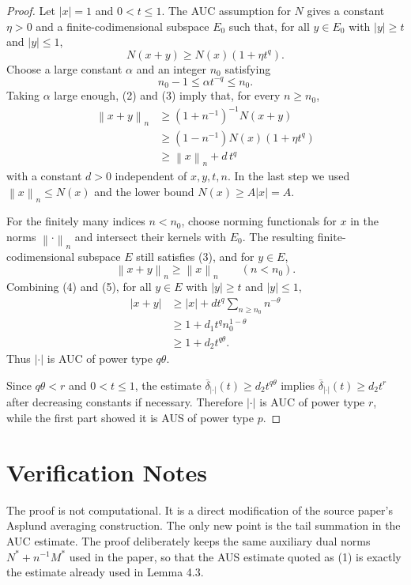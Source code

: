 \documentclass[11pt]{article}
\newcommand{\norm}[1]{\left\lVert #1 \right\rVert}
\newcommand{\deltaBar}{\overline{\delta}}
\begin{document}
\begin{proof}
Let $|x|=1$ and $0<t\le 1$. The AUC assumption for $N$ gives a constant
$\eta>0$ and a finite-codimensional subspace $E_0$ such that, for all
$y\in E_0$ with $|y|\ge t$ and $|y|\le 1$,
\[
  N(x+y)\ge N(x)(1+\eta t^q).                 \tag{3}
\]
Choose a large constant $\alpha$ and an integer $n_0$ satisfying
\[
  n_0-1\le \alpha t^{-q}\le n_0.
\]
Taking $\alpha$ large enough, (2) and (3) imply that, for every $n\ge n_0$,
\[
\begin{aligned}
  \norm{x+y}_n
  &\ge (1+n^{-1})^{-1}N(x+y)\\
  &\ge (1-n^{-1})N(x)(1+\eta t^q)\\
  &\ge \norm{x}_n+d\,t^q
\end{aligned}                                      \tag{4}
\]
with a constant $d>0$ independent of $x,y,t,n$. In the last step we used
$\norm{x}_n\le N(x)$ and the lower bound $N(x)\ge A|x|=A$.

For the finitely many indices $n<n_0$, choose norming functionals for $x$ in
the norms $\norm{\cdot}_n$ and intersect their kernels with $E_0$. The resulting
finite-codimensional subspace $E$ still satisfies (3), and for $y\in E$,
\[
  \norm{x+y}_n\ge \norm{x}_n \qquad (n<n_0).       \tag{5}
\]
Combining (4) and (5), for all $y\in E$ with $|y|\ge t$ and $|y|\le 1$,
\[
\begin{aligned}
  |x+y|
  &\ge |x| + d t^q \sum_{n\ge n_0}n^{-\theta}\\
  &\ge 1+d_1 t^q n_0^{1-\theta}\\
  &\ge 1+d_2 t^{q\theta}.
\end{aligned}
\]
Thus $|\cdot|$ is AUC of power type $q\theta$.

Since $q\theta<r$ and $0<t\le 1$, the estimate
$\deltaBar_{|\cdot|}(t)\ge d_2t^{q\theta}$ implies
$\deltaBar_{|\cdot|}(t)\ge d_2t^r$ after decreasing constants if necessary.
Therefore $|\cdot|$ is AUC of power type $r$, while the first part showed it
is AUS of power type $p$.
\end{proof}

\section*{Verification Notes}

The proof is not computational. It is a direct modification of the source
paper's Asplund averaging construction. The only new point is the tail
summation in the AUC estimate. The proof deliberately keeps the same auxiliary
dual norms $N^*+n^{-1}M^*$ used in the paper, so that the AUS estimate
quoted as (1) is exactly the estimate already used in Lemma 4.3.
\end{document}
